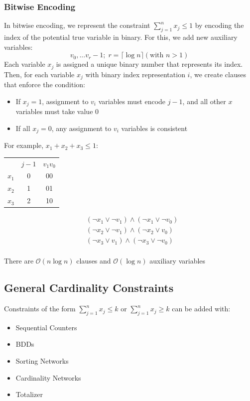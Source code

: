 \documentclass[10pt,a4paper]{report}
\begin{document}
\subsubsection{Bitwise Encoding}
In bitwise encoding, we represent the constraint $\sum_{j=1}^n x_j \leq 1$ by encoding the index of the potential true variable in binary. For this, we add new auxiliary variables:
$$
v_0, ... v_r-1;\; r=\lceil \log n \rceil (\text{with } n > 1)
$$
Each variable $x_j$ is assigned a unique binary number that represents its index. Then, for each variable $x_j$ with binary index representation $i$, we create clauses that enforce the condition: 
\begin{itemize}
    \item If $x_j = 1$, assignment to $v_i$ variables must encode $j - 1$, and all other $x$ variables must take value 0
    \item If all $x_j = 0$, any assignment to $v_i$ variables is consistent
\end{itemize}
For example, $x_1 + x_2 + x_3 \leq 1$:\\
\begin{minipage}{0.4\textwidth} 
    \centering
    \begin{table}[H]
        \begin{tabular}{ccc}
              & $j-1$ & $v_1v_0$ \\ \cline{1-3}
        $x_1$ & 0     & 00   \\
        $x_2$ & 1     & 01  \\
        $x_3$ & 2     & 10   
        \end{tabular}
    \end{table}
\end{minipage}
\begin{minipage}{0.55\textwidth} 
    \begin{align*}
        &(\neg x_1 \lor \neg v_1) \land (\neg x_1 \lor \neg v_0)\\
        &(\neg x_2 \lor \neg v_1) \land (\neg x_2 \lor v_0)\\
        &(\neg x_3 \lor v_1) \land (\neg x_3 \lor \neg v_0)\\
    \end{align*}
\end{minipage}
There are $\mathcal{O}(n\log n)$ clauses and $\mathcal{O}(\log n)$ auxiliary variables

\subsection{General Cardinality Constraints}
Constraints of the form $\sum_{j=1}^n x_j \leq k$ or $\sum_{j=1}^n x_j \geq k$ can be added with:
\begin{itemize}
    \item Sequential Counters
    \item BDDs
    \item Sorting Networks
    \item Cardinality Networks
    \item Totalizer
\end{itemize}
\end{document}
